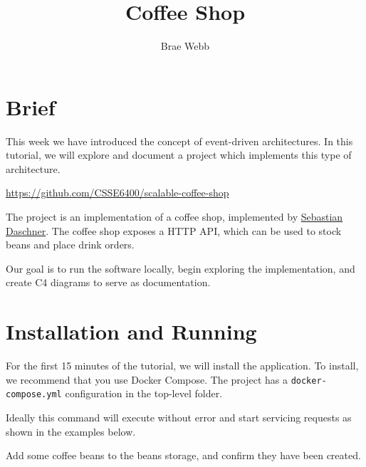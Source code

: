 \documentclass{csse4400}
\title{Coffee Shop}
\author{Brae Webb}
\date{\week{6}}
\begin{document}
\maketitle

\section{Brief}

This week we have introduced the concept of event-driven architectures.
In this tutorial, we will explore and document a project which implements this type of architecture.

\url{https://github.com/CSSE6400/scalable-coffee-shop}

\noindent
The project is an implementation of a coffee shop, implemented by 
\href{https://github.com/sdaschner/scalable-coffee-shop}{Sebastian Daschner}.
The coffee shop exposes a HTTP API, which can be used to stock beans and place drink orders.

Our goal is to run the software locally, begin exploring the implementation, and create C4 diagrams to serve as documentation.

\section{Installation and Running}

For the first 15 minutes of the tutorial,
we will install the application.
To install, we recommend that you use Docker Compose.
The project has a \texttt{docker-compose.yml} configuration in the top-level folder.


\noindent
Ideally this command will execute without error and start servicing requests as shown in the examples below.

\vspace{2mm}

\vspace{1mm}
\noindent
Add some coffee beans to the beans storage, and confirm they have been created.
\end{document}
